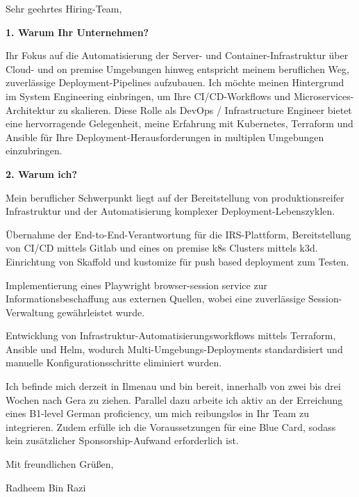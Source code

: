 \documentclass[11pt,a4paper]{coverletter}
\begin{document}

\opening{Sehr geehrtes Hiring-Team,}

\vspace{8pt}\noindent\textbf{1. Warum Ihr Unternehmen?}\par\vspace{3pt}

Ihr Fokus auf die Automatisierung der Server- und Container-Infrastruktur über Cloud- und on premise Umgebungen hinweg entspricht meinem beruflichen Weg, zuverlässige Deployment-Pipelines aufzubauen. Ich möchte meinen Hintergrund im System Engineering einbringen, um Ihre CI/CD-Workflows und Microservices-Architektur zu skalieren. Diese Rolle als DevOps / Infrastructure Engineer bietet eine hervorragende Gelegenheit, meine Erfahrung mit Kubernetes, Terraform und Ansible für Ihre Deployment-Herausforderungen in multiplen Umgebungen einzubringen.

\vspace{8pt}\noindent\textbf{2. Warum ich?}\par\vspace{3pt}

Mein beruflicher Schwerpunkt liegt auf der Bereitstellung von produktionsreifer Infrastruktur und der Automatisierung komplexer Deployment-Lebenszyklen.

\bullets

  \item Übernahme der End-to-End-Verantwortung für die IRS-Plattform, Bereitstellung von CI/CD mittels Gitlab und eines on premise k8s Clusters mittels k3d. Einrichtung von Skaffold und kustomize für push based deployment zum Testen.

  \item Implementierung eines Playwright browser-session service zur Informationsbeschaffung aus externen Quellen, wobei eine zuverlässige Session-Verwaltung gewährleistet wurde.

  \item Entwicklung von Infrastruktur-Automatisierungsworkflows mittels Terraform, Ansible und Helm, wodurch Multi-Umgebungs-Deployments standardisiert und manuelle Konfigurationsschritte eliminiert wurden.

\bulletsend

Ich befinde mich derzeit in Ilmenau und bin bereit, innerhalb von zwei bis drei Wochen nach Gera zu ziehen. Parallel dazu arbeite ich aktiv an der Erreichung eines B1-level German proficiency, um mich reibungslos in Ihr Team zu integrieren. Zudem erfülle ich die Voraussetzungen für eine Blue Card, sodass kein zusätzlicher Sponsorship-Aufwand erforderlich ist.

\closing{Mit freundlichen Grüßen,}{Radheem Bin Razi}
\end{document}
